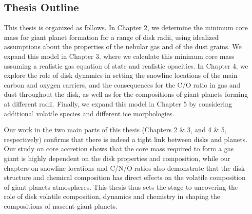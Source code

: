 \subsection{Thesis Outline}

This thesis is organized as follows. In Chapter 2, we determine the minimum core mass for giant planet formation for a range of disk radii, using idealized assumptions about the properties of the nebular gas and of the dust grains. We expand this model in Chapter 3, where we calculate this minimum core mass assuming a realistic gas equation of state and realistic opacities. In Chapter 4, we explore the role of disk dynamics in setting the snowline locations of the main carbon and oxygen carriers, and the consequences for the C/O ratio in gas and dust throughout the disk, as well as for the compositions of giant planets forming at different radii. Finally, we expand this model in Chapter 5 by considering additional volatile species and different ice morphologies. 


Our work in the two main parts of this thesis (Chapters 2 \& 3, and 4 \& 5, respectively) confirms that there is indeed a tight link between disks and planets. Our study on core accretion shows that the core mass required to form a gas giant is highly dependent on the disk properties and composition, while our chapters on snowline locations and C/N/O ratios also demonstrate that the disk structure and chemical composition has direct effects on the volatile composition of giant planets atmospheres. This thesis thus sets the stage to uncovering the role of disk volatile composition, dynamics and chemistry in shaping the compositions of nascent giant planets. 

